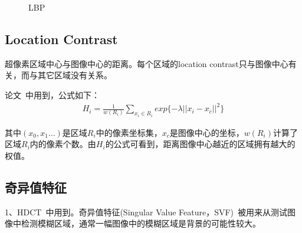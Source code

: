 \documentclass[12pt]{article}
\begin{document}
\begin{figure}
  \centering 
  \caption{LBP}
  \label{fig: LBP特征} %
\end{figure}

\subsection{Location Contrast}

超像素区域中心与图像中心的距离。每个区域的location contrast只与图像中心有关，而与其它区域没有关系。

论文~\cite{yan2013hierarchical}中用到，公式如下：
\begin{align}
H_i = \frac{1}{w(R_i)}\sum_{x_i \in R_i} exp\{-\lambda||x_i-x_c||^2\}
\end{align}

其中$(x_0, x_1 \ldots)$是区域$R_i$中的像素坐标集，$x_c$是图像中心的坐标，$w(R_i)$计算了区域$R_i$内的像素个数。由$H_i$的公式可看到，距离图像中心越近的区域拥有越大的权值。

\subsection{奇异值特征}

1、HDCT~\cite{kim2014salient}中用到。奇异值特征(Singular Value Feature，SVF)~\cite{su2011blurred}被用来从测试图像中检测模糊区域，通常一幅图像中的模糊区域是背景的可能性较大。
\end{document}
